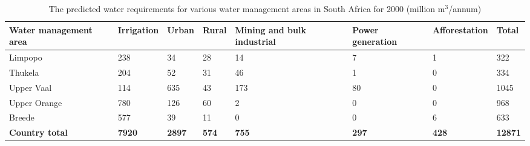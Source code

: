 \begin{table}[h]
\begin{center}
\caption{The predicted water requirements for various water management areas in South Africa for 2000 (million m$^{3}$/annum)}
\label{tab:water requirements}
\begin{tabular}{|p{3cm}|p{1.5cm}|p{1cm}|p{1cm}|p{1.5cm}|p{1cm}|p{1.5cm}|p{1cm}|}\hline
Water management area & Irrigation & Urban & Rural & Mining and bulk industrial & Power generation & Afforestation & Total \\\hline
Limpopo & 238 & 34 & 28 & 14 & 7 & 1 & 322 \\\hline
Thukela & 204 & 52 & 31 & 46 & 1 & 0 & 334 \\\hline
Upper Vaal & 114 & 635 & 43 & 173 & 80 & 0 & 1045 \\\hline
Upper Orange & 780 & 126 & 60 & 2 & 0 & 0 & 968 \\\hline
Breede & 577 & 39 & 11 & 0 & 0 & 6 & 633 \\\hline\hline
\textbf{Country total} & \textbf{7920} & \textbf{2897} & \textbf{574} & \textbf{755} & \textbf{297} & \textbf{428} & \textbf{12871} \\\hline
\end{tabular}
\end{center}
\end{table}

